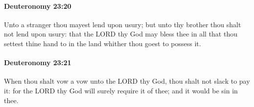 		\paragraph{Deuteronomy 23:20} %
			\label{DEUTERONOMY-23-20}

			Unto a stranger thou mayest lend upon usury; but unto thy brother thou shalt not lend upon usury: that the LORD thy God may bless thee in all that thou settest thine hand to in the land whither thou goest to possess it.


		\paragraph{Deuteronomy 23:21} %
			\label{DEUTERONOMY-23-21}

			When thou shalt vow a vow unto the LORD thy God, thou shalt not slack to pay it: for the LORD thy God will surely require it of thee; and it would be sin in thee.

